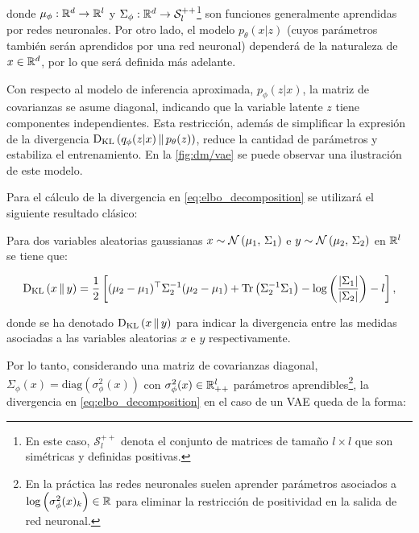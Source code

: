 donde $\mu_\phi:\mathbb{R}^d\to\mathbb{R}^l$ y $\Sigma_\phi:\mathbb{R}^d\to\mathcal{S}_l^{++}$\footnote{En este caso, $\mathcal{S}_l^{++}$ denota el conjunto de matrices de tamaño $l\times l$ que son simétricas y definidas positivas.} son funciones generalmente aprendidas por redes neuronales. Por otro lado, el modelo $p_\theta(x|z)$ (cuyos parámetros también serán aprendidos por una red neuronal) dependerá de la naturaleza de $x\in\mathbb{R}^d$, por lo que será definida más adelante.

Con respecto al modelo de inferencia aproximada, $p_\phi(z|x)$, la matriz de covarianzas se asume diagonal, indicando que la variable latente $z$ tiene componentes independientes. Esta restricción, además de simplificar la expresión de la divergencia $\operatorname{D_{KL}}\left(q_\phi(z|x)\,\|\,p_\theta(z)\right)$, reduce la cantidad de parámetros y estabiliza el entrenamiento. En la \autoref{fig:dm/vae} se puede observar una ilustración de este modelo.


Para el cálculo de la divergencia en \eqref{eq:elbo_decomposition} se utilizará el siguiente resultado clásico:

\begin{teo}
    \label{teo:kl_gaussians}

    Para dos variables aleatorias gaussianas $x\sim\mathcal{N}\left(\mu_1,\,\Sigma_1\right)$ e $y\sim\mathcal{N}\left(\mu_2,\,\Sigma_2\right)$ en $\mathbb{R}^l$ se tiene que:

    \begin{equation*}
        \operatorname{D_{KL}}\left(x\,\|\,y\right) = \frac{1}{2}\left[(\mu_2-\mu_1)^\top\Sigma_2^{-1}(\mu_2-\mu_1) + \operatorname{Tr}\left(\Sigma_2^{-1}\Sigma_1\right) - \log\left(\frac{|\Sigma_1|}{|\Sigma_2|}\right)-l\right],
    \end{equation*}

    donde se ha denotado $\operatorname{D_{KL}}\left(x\,\|\,y\right)$ para indicar la divergencia entre las medidas asociadas a las variables aleatorias $x$ e $y$ respectivamente.
\end{teo}

Por lo tanto, considerando una matriz de covarianzas diagonal, $\Sigma_\phi(x) = \text{diag}(\sigma_\phi^2(x))$ con $\sigma_\phi^2(x)\in\mathbb{R}^l_{++}$ parámetros aprendibles\footnote{En la práctica las redes neuronales suelen aprender parámetros asociados a $\log\left(\sigma_\phi^2(x)_k\right)\in\mathbb{R}$ para eliminar la restricción de positividad en la salida de red neuronal.}, la divergencia en \eqref{eq:elbo_decomposition} en el caso de un VAE queda de la forma:

